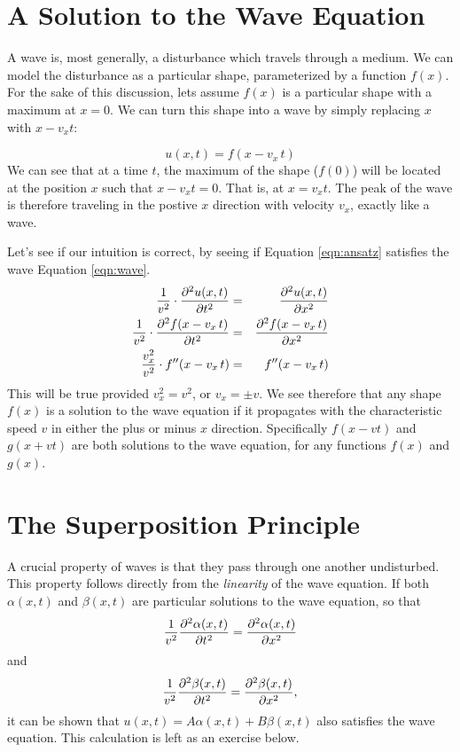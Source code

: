 \documentclass[12pt]{article}
\begin{document}
\section{A Solution to the Wave Equation}

A wave is, most generally, a disturbance which travels through a medium.  We can model the disturbance as a particular shape, parameterized by a function $f(x)$.  For the sake of this discussion, lets assume $f(x)$ is a particular shape with a maximum at $x=0$.  We can turn this shape into a wave by simply replacing $x$ with $x-v_x t$:

\begin{equation} \label{eqn:ansatz}
u(x,t) = f(x-v_x \, t)
\end{equation}
We can see that at a time $t$, the maximum of the shape ($f(0)$) will be located at the position $x$ such that $x-v_x t = 0$.  That is, at $x = v_x t$.  The peak of the wave is therefore traveling in the postive $x$ direction with velocity $v_x$, exactly like a wave.

Let's see if our intuition is correct, by seeing if Equation
\ref{eqn:ansatz} satisfies the wave Equation \ref{eqn:wave}.
\begin{eqnarray*}
\frac{1}{v^2} \cdot \frac{\partial^2 u(x,t)}{\partial t^2} & = & \frac{\partial^2 u(x,t)}{\partial x^2} \\
\frac{1}{v^2} \cdot \frac{\partial^2 f(x-v_x \, t)}{\partial t^2} & = & \frac{\partial^2 f(x-v_x \, t)}{\partial x^2} \\
\frac{v_x^2}{v^2} \cdot f''(x-v_x \, t) & = & f''(x-v_x \, t) \\ 
\end{eqnarray*}
This will be true provided $v_x^2 = v^2$, or $v_x = \pm v$.  We see therefore that any shape $f(x)$ is a solution to the wave equation if it propagates with the characteristic speed $v$ in either the plus or minus $x$ direction.  Specifically $f(x-v t)$ and $g(x+v t)$ are both solutions to the wave equation, for any functions $f(x)$ and $g(x)$.

\section{The Superposition Principle}

A crucial property of waves is that they pass through one another
undisturbed.  This property follows directly from the {\em linearity} of the wave equation.
If both $\alpha(x,t)$ and $\beta(x,t)$ are particular solutions to the wave equation, so that
\begin{equation} 
\frac{1}{v^2} \frac{\partial^2 \alpha(x,t)}{\partial t^2} = \frac{\partial^2 \alpha(x,t)}{\partial x^2}
\end{equation}  
and
\begin{equation}
\frac{1}{v^2} \frac{\partial^2 \beta(x,t)}{\partial t^2} = \frac{\partial^2 \beta(x,t)}{\partial x^2},
\end{equation}
it can be shown that $u(x,t) = A \alpha(x,t) + B \beta(x,t)$ also satisfies the
wave equation.  This calculation is left as an exercise below.
\end{document}
